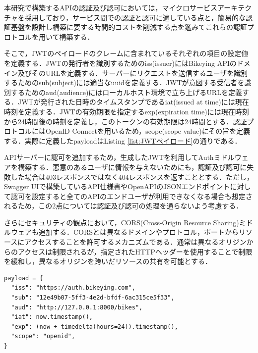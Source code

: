           \par 本研究で構築するAPIの認証及び認可においては，マイクロサービスアーキテクチャを採用しており，サービス間での認証と認可に適している点と，簡易的な認証基盤を設計し構築に要する時間的コストを削減する点を鑑みてこれらの認証プロトコルを用いて構築する．
          \par そこで，JWTのペイロードのクレームに含まれているそれぞれの項目の設定値を定義する．JWTの発行者を識別するためのiss(issuer)にはBikeying APIのドメイン及びそのURLを定義する．サーバーにリクエストを送信するユーザを識別するためのsub(subject)には適当なuuidを定義する．JWTが意図する受信者を識別するためのaud(audience)にはローカルホスト環境で立ち上げるURLを定義する．JWTが発行された日時のタイムスタンプであるiat(issued at time)には現在時刻を定義する．JWTの有効期限を指定するexp(expiration time)には現在時刻から24時間後の時刻を定義し，このトークンの有効期限は24時間とする．認証プロトコルにはOpenID Connectを用いるため，scope(scope value)にその旨を定義する．実際に定義したpayloadはListing \ref{list:JWTペイロード}の通りである．
          \par APIサーバーに認可を追加するため，生成したJWTを利用してAuthミドルウェアを構築する．悪意のあるユーザに情報を与えないためにも，認証及び認可に失敗した場合は403レスポンスではなく404レスポンスを返すこととする．ただし，Swagger UIで構築しているAPI仕様書やOpenAPIのJSONエンドポイントに対して認可を設定すると全てのAPIのエンドユーザが利用できなくなる場合も想定されるため，この2点については認証及び認可の処理を通らないよう考慮する．
          \par さらにセキュリティの観点において，CORS(Cross-Origin Resource Sharing)ミドルウェアも追加する．CORSとは異なるドメインやプロトコル，ポートからリソースにアクセスすることを許可するメカニズムである．通常は異なるオリジンからのアクセスは制限されるが，指定されたHTTPヘッダーを使用することで制限を緩和し，異なるオリジンを跨いだリソースの共有を可能とする．

\begin{lstlisting}[caption={JWTペイロード}, label={list:JWTペイロード}, basicstyle=\ttfamily\footnotesize]
payload = {
  "iss": "https://auth.bikeying.com",
  "sub": "12e49b07-5ff3-4e2d-bfdf-6ac315ce5f33",
  "aud": "http://127.0.0.1:8000/bikes",
  "iat": now.timestamp(),
  "exp": (now + timedelta(hours=24)).timestamp(),
  "scope": "openid",
}
\end{lstlisting}
